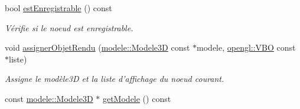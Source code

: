 \begin{DoxyCompactItemize}
bool \hyperlink{group__inf2990_ga6a6af3639f1b4e3e33a126703376dcec}{est\-Enregistrable} () const 
\begin{DoxyCompactList}\small\item\em Vérifie si le noeud est enregistrable. \end{DoxyCompactList}\item 
void \hyperlink{group__inf2990_ga1f533acce98fbad7fa82758ccaea55ff}{assigner\-Objet\-Rendu} (\hyperlink{classmodele_1_1_modele3_d}{modele\-::\-Modele3\-D} const $\ast$modele, \hyperlink{classopengl_1_1_v_b_o}{opengl\-::\-V\-B\-O} const $\ast$liste)
\begin{DoxyCompactList}\small\item\em Assigne le modèle3\-D et la liste d'affichage du noeud courant. \end{DoxyCompactList}\item 
\hypertarget{group__inf2990_ga93e3a8fcc7fc1c325ee8c41c28714a1a}{const \hyperlink{classmodele_1_1_modele3_d}{modele\-::\-Modele3\-D} $\ast$ \hyperlink{group__inf2990_ga93e3a8fcc7fc1c325ee8c41c28714a1a}{get\-Modele} () const }\label{group__inf2990_ga93e3a8fcc7fc1c325ee8c41c28714a1a}


\end{DoxyCompactItemize}
